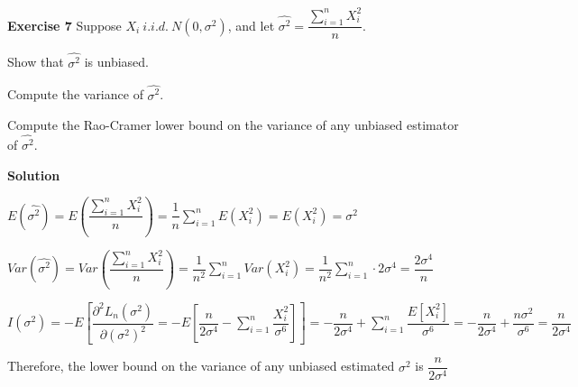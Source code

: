 \documentclass[12pt]{article}
\begin{document}
\textbf{Exercise 7} Suppose $X_i ~ i.i.d.\ N\left(0, \sigma^2\right)$, and let $\hat{\sigma^2}=\dfrac{\sum_{i=1}^n X_i^2}{n}$.
\begin{list}{()~}{}
\item Show that $\hat{\sigma^2}$ is unbiased.
\item Compute the variance of $\hat{\sigma^2}$.
\item Compute the Rao-Cramer lower bound on the variance of any unbiased estimator of $\hat{\sigma^2}$.
\end{list}

\medskip

\textbf{Solution}

\begin{list}{()~}{}
\item $E\left(\hat{\sigma^2}\right)=E\left(\dfrac{\sum_{i=1}^n X_i^2}{n}\right)=\dfrac{1}{n}\sum_{i=1}^n E\left(X_i^2\right)=E\left(X_i^2\right)=\sigma^2$
\item $Var\left(\hat{\sigma^2}\right)=Var\left(\dfrac{\sum_{i=1}^n X_i^2}{n}\right)=\dfrac{1}{n^2}\sum_{i=1}^n Var\left(X_i^2\right)=\dfrac{1}{n^2}\sum_{i=1}^n\cdot 2\sigma^4=\dfrac{2\sigma^4}{n}$
\item $I\left(\sigma^2\right)=-E\left[\dfrac{\partial^2 L_n\left(\sigma^2\right)}{\partial\left(\sigma^2\right)^2}=-E\left[\dfrac{n}{2\sigma^4} - \sum_{i=1}^n\dfrac{X_i^2}{\sigma^6}\right]\right]=-\dfrac{n}{2\sigma^4}+\sum_{i=1}^n\dfrac{E\left[X_i^2\right]}{\sigma^6}=-\dfrac{n}{2\sigma^4}+\dfrac{n\sigma^2}{\sigma^6}=\dfrac{n}{2\sigma^4}$

Therefore, the lower bound on the variance of any unbiased estimated $\sigma^2$ is $\dfrac{n}{2\sigma^4}$
\end{list}
\end{document}
